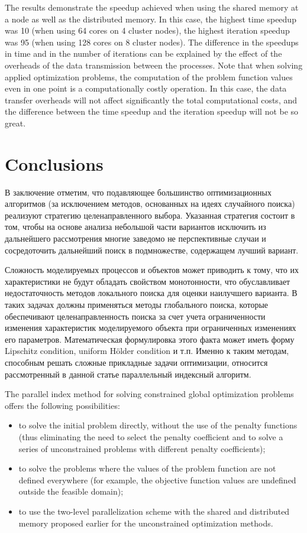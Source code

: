 \documentclass[smallextended]{svjour3}       %
\begin{document}
The results demonstrate the speedup achieved when using the shared memory at a node as well as the distributed memory. In this case, the highest time speedup was 10 (when using 64 cores on 4 cluster nodes), the highest iteration speedup was 95 (when using 128 cores on 8 cluster nodes). The difference in the speedups in time and in the number of iterations can be explained by the effect of the overheads of the data transmission between the processes. Note that when solving applied optimization problems, the computation of the problem function values even in one point is a computationally costly operation. In this case, the data transfer overheads will not affect significantly the total computational costs, and the difference between the time speedup and the iteration speedup will not be so great.


\section{Conclusions}
\label{sec:5}

\Russian
В заключение отметим, что подавляющее большинство оптимизационных алгоритмов (за исключением методов, основанных на идеях случайного поиска) реализуют стратегию целенаправленного выбора. Указанная стратегия состоит в том, чтобы на основе анализа небольшой части вариантов исключить из дальнейшего рассмотрения многие заведомо не перспективные случаи и сосредоточить дальнейший поиск в подмножестве, содержащем лучший вариант. 

Сложность моделируемых процессов и объектов может приводить к тому, что их характеристики не будут обладать свойством монотонности, что обуславливает недостаточность методов локального поиска для оценки наилучшего варианта. В таких задачах должны применяться методы глобального поиска, которые обеспечивают целенаправленность поиска за счет учета ограниченности изменения характеристик моделируемого объекта при ограниченных изменениях его параметров. Математическая формулировка этого факта может иметь форму Lipschitz condition, uniform H\"older condition и т.п. Именно к таким методам, способным решать сложные прикладные задачи оптимизации, относится рассмотренный в данной статье параллельный индексный алгоритм. 

The parallel index method for solving constrained global optimization problems %
offers the following possibilities:
\begin{itemize}
	\item to solve the initial problem directly, without the use of the penalty functions (thus eliminating the need to select the penalty coefficient and to solve a series of unconstrained problems with different penalty coefficients);
	\item to solve the problems where the values of the problem function are not defined everywhere (for example, the objective function values are undefined outside the feasible domain);
	\item to use the two-level parallelization scheme with the shared and distributed memory proposed earlier for the unconstrained optimization methods.
\end{itemize}
\end{document}
